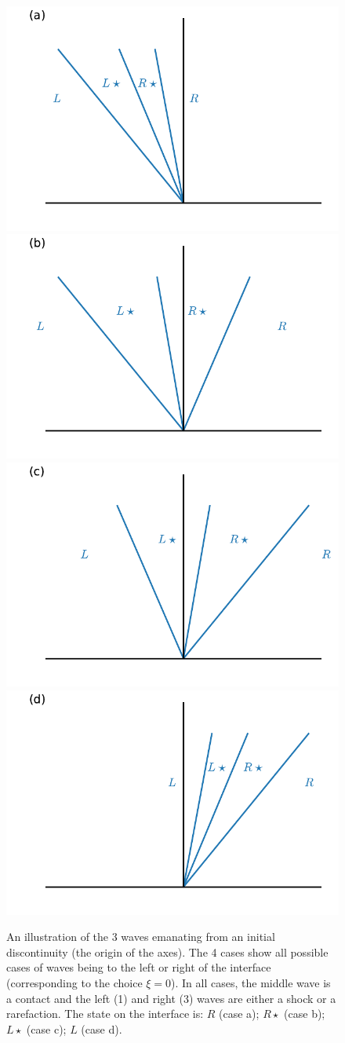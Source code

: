 \begin{figure}
\centering
\includegraphics[width=0.49\linewidth]{riemann_waves_ifc_R}
\includegraphics[width=0.49\linewidth]{riemann_waves_ifc_Rstar} \\
\includegraphics[width=0.49\linewidth]{riemann_waves_ifc_Lstar}
\includegraphics[width=0.49\linewidth]{riemann_waves_ifc_L} 
\caption[Wave configuration for the Riemann problem]
        {\label{fig:euler:riemann_sample} An illustration of the 3
          waves emanating from an initial discontinuity (the origin of
          the axes).  The 4 cases show all possible cases of waves
          being to the left or right of the interface (corresponding
          to the choice $\xi = 0$).  In all cases, the middle wave is
          a contact and the left (1) and right (3) waves are either a
          shock or a rarefaction.  The state on the interface is: $R$
          (case a); $R\star$ (case b); $L\star$ (case c); $L$ (case
          d).}
\end{figure}

